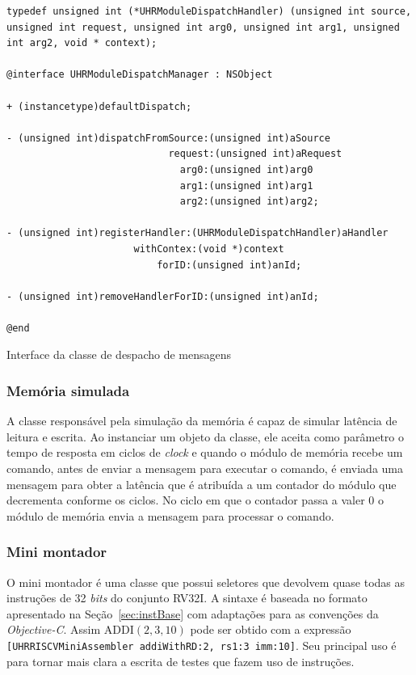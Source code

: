 \begin{program}
  \centering

\lstset{language=[Objective]C}
\begin{lstlisting}[style=wider]
typedef unsigned int (*UHRModuleDispatchHandler) (unsigned int source, unsigned int request, unsigned int arg0, unsigned int arg1, unsigned int arg2, void * context);

@interface UHRModuleDispatchManager : NSObject

+ (instancetype)defaultDispatch;

- (unsigned int)dispatchFromSource:(unsigned int)aSource
                            request:(unsigned int)aRequest
                              arg0:(unsigned int)arg0
                              arg1:(unsigned int)arg1
                              arg2:(unsigned int)arg2;

- (unsigned int)registerHandler:(UHRModuleDispatchHandler)aHandler
                      withContex:(void *)context
                          forID:(unsigned int)anId;

- (unsigned int)removeHandlerForID:(unsigned int)anId;

@end
\end{lstlisting}

  \caption{Interface da classe de despacho de mensagens \label{code:despacho}}
\end{program}

\subsubsection{Memória simulada}
\label{ssec:memsim}

A classe responsável pela simulação da memória é capaz de simular latência de leitura e escrita.
Ao instanciar um objeto da classe, ele aceita como parâmetro o tempo de resposta em ciclos de \emph{clock} e
quando o módulo de memória recebe um comando, antes de enviar a mensagem para executar o comando, é
enviada uma mensagem para obter a latência que é atribuída a um contador do módulo que decrementa conforme os
ciclos. No ciclo em que o contador passa a valer 0 o módulo de memória envia a mensagem para processar o comando.

\subsubsection{Mini montador}
\label{ssec:miniasm}

O mini montador é uma classe que possui seletores que devolvem quase todas as instruções de 32 \emph{bits} do conjunto RV32I.
A sintaxe é baseada no formato apresentado na Seção~\ref{sec:instBase} com adaptações para as convenções da \emph{Objective-C}.
Assim $\text{ADDI}(2, 3, 10)$ pode ser obtido com a expressão \texttt{[UHRRISCVMiniAssembler addiWithRD:2, rs1:3 imm:10]}.
Seu principal uso é para tornar mais clara a escrita de testes que fazem uso de instruções.

